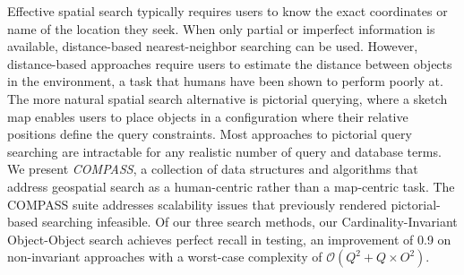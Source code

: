

Effective spatial search typically requires users to know the exact coordinates or name of the location they seek.
When only partial or imperfect information is available, distance-based nearest-neighbor searching can be used.
However, distance-based approaches require users to estimate the distance between objects in the environment, a task that humans have been shown to perform poorly at.
The more natural spatial search alternative is pictorial querying, where a sketch map enables users to place objects in a configuration where their relative positions define the query constraints.
Most approaches to pictorial query searching are intractable for any realistic number of query and database terms.
We present \emph{COMPASS}, a collection of data structures and algorithms that address geospatial search as a human-centric rather than a map-centric task. 
The COMPASS suite addresses scalability issues that previously rendered pictorial-based searching infeasible. 
Of our three search methods, our Cardinality-Invariant Object-Object search achieves perfect recall in testing, an improvement of 0.9 on non-invariant approaches with a worst-case complexity of $\mathcal{O}(Q^2 + Q\times O^2)$.






